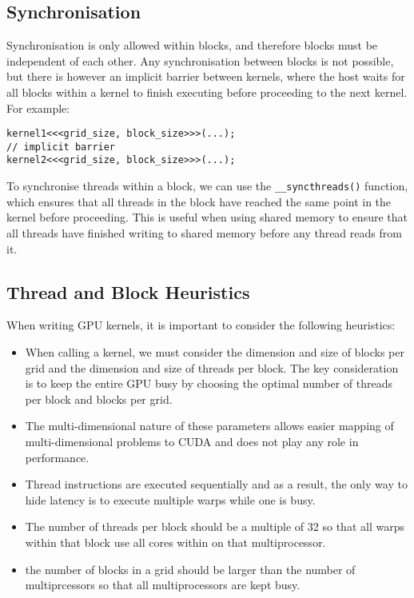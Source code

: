 \documentclass{article}
\begin{document}
\subsection{Synchronisation}
Synchronisation is only allowed within blocks, and therefore blocks
must be independent of each other. Any synchronisation between blocks
is not possible, but there is however an implicit barrier between
kernels, where the host waits for all blocks within a kernel to finish
executing before proceeding to the next kernel. For example:
\begin{verbatim}
kernel1<<<grid_size, block_size>>>(...);
// implicit barrier
kernel2<<<grid_size, block_size>>>(...);
\end{verbatim}
To synchronise threads within a block, we can use the
\texttt{__syncthreads()} function, which ensures that all
threads in the block have reached the same point in the kernel before
proceeding. This is useful when using shared memory to ensure that all
threads have finished writing to shared memory before any thread reads
from it.
\subsection{Thread and Block Heuristics}
When writing GPU kernels, it is important to consider the following
heuristics:
\begin{itemize}
    \item When calling a kernel, we must consider the dimension and
          size of blocks per grid and the dimension and size of threads
          per block. The key consideration is to keep the entire GPU
          busy by choosing the optimal number of threads per block and
          blocks per grid.
    \item The multi-dimensional nature of these parameters allows
          easier mapping of multi-dimensional problems to CUDA and does
          not play any role in performance.
    \item Thread instructions are executed sequentially and as a
          result, the only way to hide latency is to execute multiple
          warps while one is busy.
    \item The number of threads per block should be a multiple of 32 so
          that all warps within that block use all cores within on that
          multiprocessor.
    \item the number of blocks in a grid should be larger than the
          number of multiprcessors so that all multiprocessors are kept
          busy.
\end{itemize}
\end{document}
